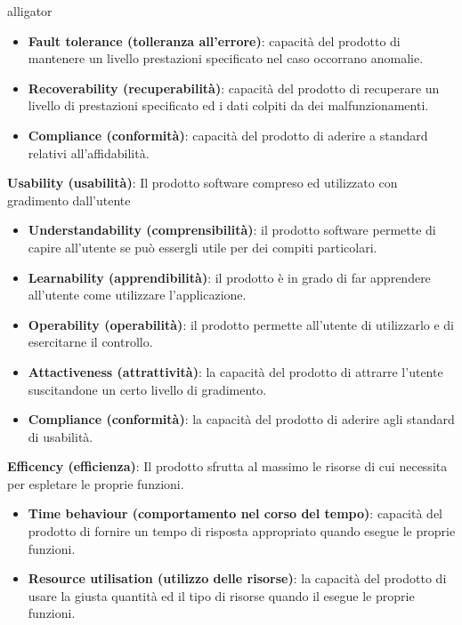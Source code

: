 \begin{labeling}{alligator}
\begin{itemize}
		\item \textbf{Fault tolerance (tolleranza all'errore)}: capacità del prodotto di mantenere un livello prestazioni specificato nel caso occorrano anomalie.
		
		\item \textbf{Recoverability (recuperabilità)}: capacità del prodotto di recuperare un livello di prestazioni specificato ed i dati colpiti da dei malfunzionamenti.
		
		\item \textbf{Compliance (conformità)}: capacità del prodotto di aderire a standard relativi all'affidabilità.
	\end{itemize}
	
	\item \textbf{Usability (usabilità)}: Il prodotto software compreso ed utilizzato con gradimento dall'utente
	\begin{itemize}
		\item \textbf{Understandability (comprensibilità)}: il prodotto software permette di capire all'utente se può essergli utile per dei compiti particolari.
		
		\item \textbf{Learnability (apprendibilità)}: il prodotto è in grado di far apprendere all'utente come utilizzare l'applicazione.
		
		\item \textbf{Operability (operabilità)}: il prodotto permette all'utente di utilizzarlo e di esercitarne il controllo.
		
		\item \textbf{Attactiveness (attrattività)}: la capacità del prodotto di attrarre l'utente suscitandone un certo livello di gradimento.
		
		\item \textbf{Compliance (conformità)}: la capacità del prodotto di aderire agli standard di usabilità.
	\end{itemize}
	
	\item \textbf{Efficency (efficienza)}: Il prodotto sfrutta al massimo le risorse di cui necessita per espletare le proprie funzioni.
	\begin{itemize}
		\item \textbf{Time behaviour (comportamento nel corso del tempo)}: capacità del prodotto di fornire un tempo di risposta appropriato quando esegue le proprie funzioni.
		
		\item \textbf{Resource utilisation (utilizzo delle risorse)}: la capacità del prodotto di usare la giusta quantità ed il tipo di risorse quando il  esegue le proprie funzioni.
		

\end{itemize}
\end{labeling}
